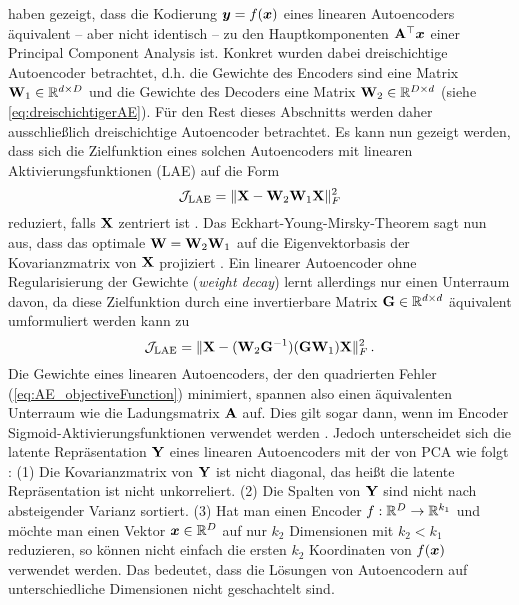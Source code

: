 \textcite{Bourlard.1988} haben gezeigt, dass die Kodierung $\bm{y} = f(\bm{x})$ eines linearen Autoencoders äquivalent -- aber nicht identisch -- zu den Hauptkomponenten $\mathbf{A}^\top\bm{x}$ einer Principal Component Analysis ist. Konkret wurden dabei dreischichtige Autoencoder betrachtet, d.h. die Gewichte des Encoders sind eine Matrix $\mathbf{W}_1 \in \mathbb{R}^{d \times D}$ und die Gewichte des
Decoders eine Matrix $\mathbf{W}_2 \in \mathbb{R}^{D \times d}$ (siehe \eqref{eq:dreischichtigerAE}). Für den Rest dieses Abschnitts werden daher ausschließlich dreischichtige Autoencoder betrachtet. Es kann nun gezeigt werden, dass sich die Zielfunktion eines solchen Autoencoders mit linearen Aktivierungsfunktionen (LAE) auf die Form
\begin{equation}
	\mathcal{J}_{\text{LAE}} = \lVert\mathbf{X} - \mathbf{W}_2\mathbf{W}_1\mathbf{X}\rVert_F^2
\end{equation}
reduziert, falls $\mathbf{X}$ zentriert ist \parencites[Appendix A]{Kunin.2019}[292 -- 293]{Bourlard.1988}. Das Eckhart-Young-Mirsky-Theorem \parencite{Eckart.1936} sagt nun aus, dass das optimale $\mathbf{W} = \mathbf{W}_2 \mathbf{W}_1$ auf die
Eigenvektorbasis der Kovarianzmatrix von $\mathbf{X}$ projiziert \parencite[vgl.][1]{Kunin.2019}. Ein linearer Autoencoder ohne Regularisierung der Gewichte
(\textit{weight decay}) lernt allerdings nur einen Unterraum davon, da diese Zielfunktion durch
eine invertierbare Matrix $\mathbf{G} \in \mathbb{R}^{d \times d}$ äquivalent umformuliert werden kann zu \parencite[1]{Kunin.2019}
\begin{equation}
	\label{eq:PCA_AE_Unterraum_Inverse}
	\mathcal{J}_{\text{LAE}} = \lVert\mathbf{X} - (\mathbf{W}_2\mathbf{G}^{-1}) (\mathbf{G} \mathbf{W}_1)\mathbf{X}\rVert_F^2 \, .
\end{equation}
Die Gewichte eines linearen Autoencoders, der den quadrierten Fehler
(\eqref{eq:AE_objectiveFunction}) minimiert, spannen also einen äquivalenten Unterraum wie die
Ladungsmatrix $\mathbf{A}$ auf. Dies gilt sogar dann, wenn im Encoder Sigmoid-Aktivierungsfunktionen verwendet werden \parencite[291, 293]{Bourlard.1988}. Jedoch unterscheidet sich die latente Repräsentation $\mathbf{Y}$
eines linearen Autoencoders mit der von PCA wie folgt \parencite[3]{Plaut.2018}: (1) Die Kovarianzmatrix von $\mathbf{Y}$ ist nicht diagonal, das heißt die
latente Repräsentation ist nicht unkorreliert. (2) Die Spalten von $\mathbf{Y}$ sind nicht nach
absteigender Varianz sortiert. (3) Hat man einen Encoder $f: \mathbb{R}^D \rightarrow \mathbb{R}^{k_1}$ und
möchte man einen Vektor $\bm{x} \in \mathbb{R}^D$ auf nur $k_2$ Dimensionen mit $k_2 < k_1$
reduzieren, so können nicht einfach die ersten $k_2$ Koordinaten von $f(\bm{x})$ verwendet
werden. Das bedeutet, dass die Lösungen von Autoencodern auf unterschiedliche Dimensionen nicht
geschachtelt sind.

